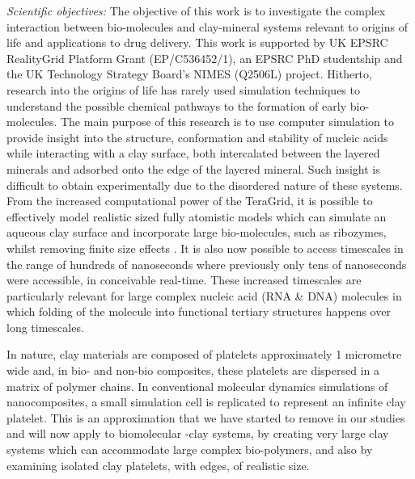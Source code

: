 \emph{Scientific objectives:} The objective of this work is to %
investigate the complex interaction between bio-molecules and clay-mineral systems relevant to origins of life and applications to drug delivery. 
This work is supported by UK EPSRC RealityGrid Platform Grant (EP/C536452/1), 
an EPSRC PhD studentship and the UK Technology Strategy Board's NIMES (Q2506L) project.
Hitherto, research into the origins of life has rarely used simulation techniques to understand the possible chemical pathways to the formation of early bio-molecules. The main purpose of this research is to use computer simulation to provide insight into the structure, conformation and stability of nucleic acids while interacting with a clay surface, both intercalated between the layered minerals and adsorbed onto the edge of the layered mineral. Such insight is difficult to obtain experimentally due to the disordered nature of these systems. From the increased computational power of the TeraGrid, it is possible to effectively model realistic sized fully atomistic models which can simulate an aqueous clay surface and incorporate large bio-molecules, such as ribozymes, whilst removing finite size effects \cite{JPCC_2007}. It is also now possible to access timescales in the range of hundreds of nanoseconds where previously only tens of nanoseconds were accessible, in conceivable real-time. These increased timescales are particularly relevant for large complex nucleic acid (RNA \& DNA) molecules in which folding of the molecule into functional tertiary structures happens over long timescales. 

In nature, clay materials are composed of platelets approximately 1
micrometre wide and, in  bio- and non-bio composites, these platelets are dispersed in a matrix of 
polymer chains.  In conventional molecular dynamics simulations of nanocomposites, a small simulation cell is replicated to represent an infinite clay platelet. This is an approximation that we have started to remove in our studies and will now apply to biomolecular -clay systems, by creating very large clay systems which can accommodate large complex bio-polymers, and also by examining isolated clay platelets, with edges, of realistic size. 

